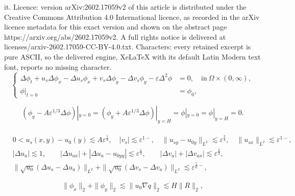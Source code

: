 \documentclass[10pt,a4paper]{amsart}
\begin{document}
it. Licence: version arXiv:2602.17059v2 of this article is distributed under the Creative Commons Attribution 4.0 International licence, as recorded in the arXiv licence metadata for this exact version and shown on the abstract page https://arxiv.org/abs/2602.17059v2. A full rights notice is delivered at licenses/arxiv-2602.17059-CC-BY-4.0.txt. Characters: every retained excerpt is pure ASCII, so the delivered engine, XeLaTeX with its default Latin Modern text font, reports no missing character.
\begin{equation}\label{Linearized_NS}
\left\{\begin{aligned}
\Delta \phi_t + u_s \Delta \phi_x - \Delta u_s \phi_x + v_s \Delta \phi_y - \Delta v_s \phi_y - \varepsilon \Delta^2 \phi &= 0, \quad \mbox{in}~\Omega \times (0,\infty),\\
\phi|_{t=0} &= \phi_0,
\end{aligned}\right.
\end{equation}

\begin{equation}\label{Navier_bc2}
(\phi_y - A\varepsilon^{1/3} \Delta \phi)|_{y=0} = (\phi_y + A\varepsilon^{1/3} \Delta \phi)|_{y=H}= \phi|_{y = 0} = \phi|_{y = H} =0.
\end{equation}\\

\begin{equation}\label{ss_estimates_H}
\begin{aligned}
&0 < u_s(x,y) - u_0(y) \lesssim A \varepsilon^{\frac{1}{3}}, \quad |v_{s}|  \lesssim \varepsilon^{1-}, \quad \|u_{sy} - u_{0y}\|_{L^2} \lesssim \varepsilon^{\frac{2}{3}}, \quad
\|u_{sx}\|_{L^2}  \lesssim \varepsilon^{1-},\\
& |\Delta u_a| \lesssim 1, \qquad | \Delta u_{ax}| + |\Delta u_a - u_{0yy}| \lesssim \varepsilon^{\frac{1}{3}},  \qquad |\Delta v_a| + |\Delta v_{ax}| \lesssim \varepsilon^{\frac{2}{3}},\\
& \| \sqrt{u_0} (\Delta u_s - \Delta u_a) \|_{L^2} + \| \sqrt{u_0} (\Delta v_s - \Delta v_a) \|_{L^2}    \lesssim \varepsilon^{\frac{5}{6}-},
\end{aligned}
\end{equation}

\begin{equation}\label{H1_control_by_R}
\|\phi_x\|_2 + \|\phi_y\|_2 \lesssim \|u_0 \nabla q\|_2 \lesssim H \|R\|_2,
\end{equation}
\end{document}

